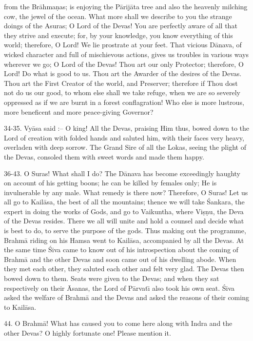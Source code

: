 from the Br\=ahma\d{n}as; is enjoying the P\=arij\=ata tree and also the heavenly milching cow, the jewel of the ocean. What more shall we describe to you the strange doings of the Asuras; O Lord of the Devas! You are perfectly aware of all that they strive and execute; for, by your knowledge, you know everything of this world; therefore, O Lord! We lie prostrate at your feet. That vicious D\=anava, of wicked character and full of mischievous actions, gives us troubles in various ways wherever we go; O Lord of the Devas! Thou art our only Protector; therefore, O Lord! Do what is good to us. Thou art the Awarder of the desires of the Devas. Thou art the First Creator of the world, and Preserver; therefore if Thou dost not do us our good, to whom else shall we take refuge, when we are so severely oppressed as if we are burnt in a forest conflagration! Who else is more lustrous, more beneficent and more peace-giving Governor?

34-35. Vy\=asa said :-- O king! All the Devas, praising Him thus, bowed down to the Lord of creation with folded hands and saluted him, with their faces very heavy, overladen with deep sorrow. The Grand Sire of all the Lokas, seeing the plight of the Devas, consoled them with sweet words and made them happy.

36-43. O Suras! What shall I do? The D\=anava has become exceedingly haughty on account of his getting boons; he can be killed by females only; He is invulnerable by any male. What remedy is there now? Therefore, O Suras! Let us all go to Kail\=asa, the best of all the mountains; thence we will take \'Sankara, the expert in doing the works of Gods, and go to Vaikuntha, where Vi\d{s}\d{n}u, the Deva of the Devas resides. There we all will unite and hold a counsel and decide what is best to do, to serve the purpose of the gods. Thus making out the programme, Brahm\=a riding on his Hamsa went to Kail\=asa, accompanied by all the Devas. At the same time \'Siva came to know out of his introspection about the coming of Brahm\=a and the other Devas and soon came out of his dwelling abode. When they met each other, they saluted each other and felt very glad. The Devas then bowed down to them. Seats were given to the Devas; and when they sat respectively on their \=Asanas, the Lord of P\=arvat\={\i} also took his own seat. \'Siva asked the welfare of Brahm\=a and the Devas and asked the reasons of their coming to Kail\=asa.

44. O Brahm\=a! What has caused you to come here along with Indra and the other Devas? O highly fortunate one! Please mention it.


